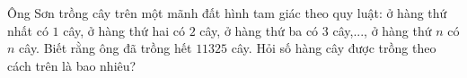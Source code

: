 \begin{ex}%
	Ông Sơn trồng cây trên một mãnh đất hình tam giác theo quy luật: ở hàng thứ nhất có $1$ cây, ở hàng thứ hai có $2$ cây, ở hàng thứ ba có $3$ cây,..., ở hàng thứ $n$ có $n$ cây. Biết rằng ông đã trồng hết $11325$ cây. Hỏi số hàng cây được trồng theo cách trên là bao nhiêu?
\end{ex}

